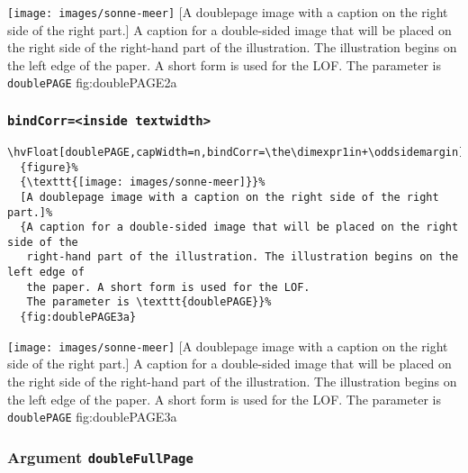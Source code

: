 \documentclass[twoside]{scrartcl}
\makeatletter
\let\hvBlindtext\Blindtext
\def\Blindtext{\par\color{black!40}\hvBlindtext\par\normalcolor}
\def\hvblindtext{\textcolor{black!40}{\blindtext@text}}
\makeatother
\begin{document}
%
  {\texttt{[image: images/sonne-meer]}}%
  [A doublepage image with a caption on the right side of the right part.]%
  {A caption for a double-sided image that will be placed on the right side of the
   right-hand part of the illustration. The illustration begins on the left edge of 
   the paper. A short form is used for the LOF. 
   The parameter is \texttt{doublePAGE}}%
  {fig:doublePAGE2a}



\Blindtext

\Blindtext

\hvblindtext
\subsubsection{\texttt{bindCorr=<inside textwidth>}}

\begin{lstlisting}
\hvFloat[doublePAGE,capWidth=n,bindCorr=\the\dimexpr1in+\oddsidemargin]%
  {figure}%
  {\texttt{[image: images/sonne-meer]}}%
  [A doublepage image with a caption on the right side of the right part.]%
  {A caption for a double-sided image that will be placed on the right side of the
   right-hand part of the illustration. The illustration begins on the left edge of 
   the paper. A short form is used for the LOF. 
   The parameter is \texttt{doublePAGE}}%
  {fig:doublePAGE3a}
\end{lstlisting}

%
  {\texttt{[image: images/sonne-meer]}}%
  [A doublepage image with a caption on the right side of the right part.]%
  {A caption for a double-sided image that will be placed on the right side of the
   right-hand part of the illustration. The illustration begins on the left edge of 
   the paper. A short form is used for the LOF. 
   The parameter is \texttt{doublePAGE}}%
  {fig:doublePAGE3a}


\Blindtext

\Blindtext




\subsubsection{Argument \texttt{doubleFullPage}}
\end{document}
